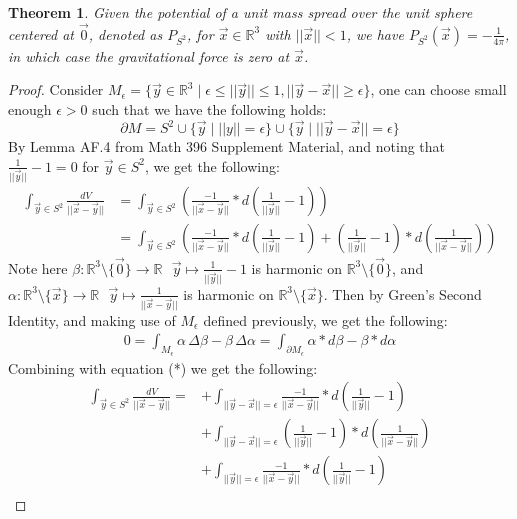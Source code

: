 \documentclass[11pt,oneside]{book}
\theoremstyle{break}
\theoremstyle{break}
\newtheorem{thm}{Theorem}[section]
\newcommand{\R}{\mathbb{R}}
\begin{document}
\begin{thm}
Given the potential of a unit mass spread over the unit sphere centered at $\vec{0}$, denoted as $P_{S^2}$, for $\vec{x}\in \R^3$ with $||\vec{x}|| < 1$, we have $P_{S^2}(\vec{x}) =- \frac{1}{4\pi}$, in which case the gravitational force is zero at $\vec{x}$. 
\end{thm}
\begin{proof}
Consider $M_{\epsilon}=\{ \vec{y}\in \R^3 \mid \epsilon \leq ||\vec{y}|| \leq 1, ||\vec{y}-\vec{x}||\geq \epsilon\}$, one can choose small enough $\epsilon >0$ such that we have the following holds:
$$\partial M = S^2 \cup \{\vec{y}\mid ||y|| = \epsilon\} \cup \{\vec{y}\mid ||\vec{y}- \vec{x}|| = \epsilon\}$$
By Lemma AF.4 from Math 396 Supplement Material, and noting that $\frac{1}{||\vec{y}||}-1 = 0$ for $\vec{y}\in S^2$, we get the following:
\begin{align*}
\int_{\vec{y}\in S^2}\frac{dV}{||\vec{x}-\vec{y}||} &= \int_{\vec{y}\in S^2}\left(\frac{-1}{||\vec{x}-\vec{y}||}*d\left(\frac{1}{||\vec{y}||}-1\right) \right)\\
&=\int_{\vec{y}\in S^2}\left(\frac{-1}{||\vec{x}-\vec{y}||}*d\left(\frac{1}{||\vec{y}||}-1\right) + \left( \frac{1}{||\vec{y}||} - 1\right) *d\left( \frac{1}{||\vec{x}-\vec{y}||}\right)\right) \tag{*}
\end{align*}
Note here $\beta: \R^3 \setminus \{\vec{0}\} \to \R \ \ \ \vec{y}\mapsto\frac{1}{||\vec{y}||} - 1$ is harmonic on $\R^3 \setminus \{\vec{0}\}$, and $\alpha: \R^3 \setminus \{\vec{x}\} \to \R \ \ \ \vec{y}\mapsto\frac{1}{||\vec{x}-\vec{y}||}$ is harmonic on $\R^3 \setminus \{\vec{x}\}$. Then by Green's Second Identity, and making use of $M_\epsilon$ defined previously, we get the following:
\begin{align*}
0 = \int_{M_\epsilon} \alpha\, \Delta \beta  - \beta\, \Delta \alpha  =\int_{\partial {M_\epsilon}} \alpha * d\beta  - \beta * d\alpha 
\end{align*}
Combining with equation (*) we get the following:
\begin{align*}
\int_{\vec{y}\in S^2}\frac{dV}{||\vec{x}-\vec{y}||} 
=&+\int_{||\vec{y} - \vec{x}|| = \epsilon} \frac{-1}{||\vec{x}-\vec{y}||}*d\left(\frac{1}{||\vec{y}||} - 1\right)\\
&+\int_{||\vec{y} - \vec{x}|| = \epsilon}\left( \frac{1}{||\vec{y}||}-1\right)*d\left(\frac{1}{||\vec{x}-\vec{y}||}\right)\\
&+\int_{||\vec{y} || = \epsilon} \frac{-1}{||\vec{x}-\vec{y}||}*d\left(\frac{1}{||\vec{y}||} - 1\right)\\

\end{align*}
\end{proof}
\end{document}
